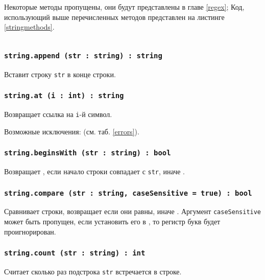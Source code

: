 Некоторые методы пропущены, они будут представлены в главе \ref{regex}; Код, использующий выше перечисленных методов представлен на листинге \ref{stringmethods}.

\begin{sourcecode}
    \label{stringmethods}
    \inputminted[linenos]{icl}{../sources/stringmethods.icL}
\end{sourcecode}

\subsubsection{\texttt{string.append (str : string) : string}}

Вставит строку \texttt{str} в конце строки.

\subsubsection{\texttt{string.at (i : int) : string}}

Возвращает ссылка на \texttt{i}-й символ.

Возможные исключения:  (см. таб. \ref{errors}).

\subsubsection{\texttt{string.beginsWith (str : string) : bool}}

Возвращает \true{}, если начало строки совпадает с \texttt{str}, иначе \false{}.

\subsubsection{\texttt{string.compare (str : string, caseSensitive = true) : bool}}

Сравнивает строки, возвращает \true{} если они равны, иначе \false{}. Аргумент \texttt{caseSensitive} может быть пропущен, если установить его в \false{}, то регистр букв будет проигнорирован.

\subsubsection{\texttt{string.count (str : string) : int}}

Считает сколько раз подстрока \texttt{str} встречается в строке.

